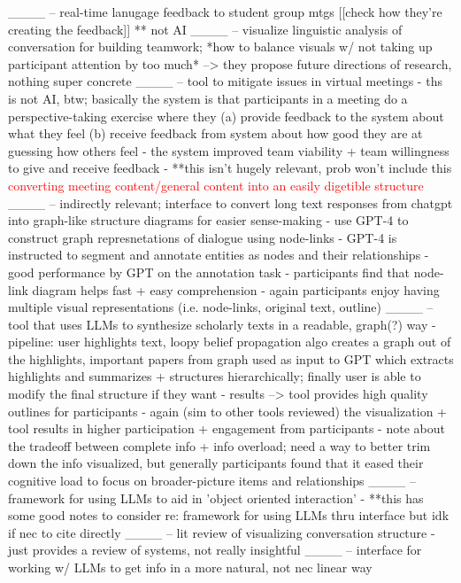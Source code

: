 ____ -- real-time lanugage feedback to student group mtgs [[check how they're creating the feedback]] ** not AI 
____ -- visualize linguistic analysis of conversation for building teamwork; *how to balance visuals w/ not taking up participant attention by too much* --> they propose future directions of research, nothing super concrete
____ -- tool to mitigate issues in virtual meetings
    - ths is not AI, btw; basically the system is that participants in a meeting do a perspective-taking exercise where they (a) provide feedback to the system about what they feel (b) receive feedback from system about how good they are at guessing how others feel
    - the system improved team viability + team willingness to give and receive feedback
    - **this isn't hugely relevant, prob won't include this
\textcolor{red}{converting meeting content/general content into an easily digetible structure}
____ -- indirectly relevant; interface to convert long text responses from chatgpt into graph-like structure diagrams for easier sense-making
    - use GPT-4 to construct graph represnetations of dialogue using node-links
    - GPT-4 is instructed to segment and annotate entities as nodes and their relationships
    - good performance by GPT on the annotation task
    - participants find that node-link diagram helps fast + easy comprehension
    - again participants enjoy having multiple visual representations (i.e. node-links, original text, outline) 
____ -- tool that uses LLMs to synthesize scholarly texts in a readable, graph(?) way
    - pipeline: user highlights text, loopy belief propagation algo creates a graph out of the highlights, important papers from graph used as input to GPT which extracts highlights and summarizes + structures hierarchically; finally user is able to modify the final structure if they want
    - results --> tool provides high quality outlines for participants
        - again (sim to other tools reviewed) the visualization + tool results in higher participation + engagement from participants
    - note about the tradeoff between complete info + info overload; need a way to better trim down the info visualized, but generally participants found that it eased their cognitive load to focus on broader-picture items and relationships
____ -- framework for using LLMs to aid in 'object oriented interaction'
    - **this has some good notes to consider re: framework for using LLMs thru interface but idk if nec to cite directly 
____ -- lit review of visualizing conversation structure
    - just provides a review of systems, not really insightful
____ -- interface for working w/ LLMs to get info in a more natural, not nec linear way


